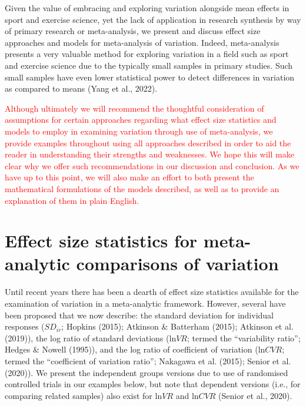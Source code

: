 \documentclass[
]{article}
\begin{document}
Given the value of embracing and exploring variation alongside mean effects in sport and exercise science, yet the lack of application in research synthesis by way of primary research or meta-analysis, we present and discuss effect size approaches and models for meta-analysis of variation. Indeed, meta-analysis presents a very valuable method for exploring variation in a field such as sport and exercise science due to the typically small samples in primary studies. Such small samples have even lower statistical power to detect differences in variation as compared to means (Yang et al., 2022).

\textcolor{red}{Although ultimately we will recommend the thoughtful consideration of assumptions for certain approaches regarding what effect size statistics and models to employ in examining variation through use of meta-analysis, we provide examples throughout using all approaches described in order to aid the reader in understanding their strengths and weaknesses. We hope this will make clear why we offer such recommendations in our discussion and conclusion. As we have up to this point, we will also make an effort to both present the mathematical formulations of the models described, as well as to provide an explanation of them in plain English.}

\hypertarget{effect-size-statistics-for-meta-analytic-comparisons-of-variation}{%
\section{Effect size statistics for meta-analytic comparisons of variation}\label{effect-size-statistics-for-meta-analytic-comparisons-of-variation}}

Until recent years there has been a dearth of effect size statistics available for the examination of variation in a meta-analytic framework. However, several have been proposed that we now describe: the standard deviation for individual responses (\(SD_{ir}\); Hopkins (2015); Atkinson \& Batterham (2015); Atkinson et al. (2019)), the log ratio of standard deviations (\(\textrm{ln}VR\); termed the ``variability ratio''; Hedges \& Nowell (1995)), and the log ratio of coefficient of variation (\(\textrm{ln}CVR\); termed the ``coefficient of variation ratio''; Nakagawa et al. (2015); Senior et al. (2020)). We present the independent groups versions due to use of randomised controlled trials in our examples below, but note that dependent versions (i.e., for comparing related samples) also exist for \(\textrm{ln}VR\) and \(\textrm{ln}CVR\) (Senior et al., 2020).
\end{document}

